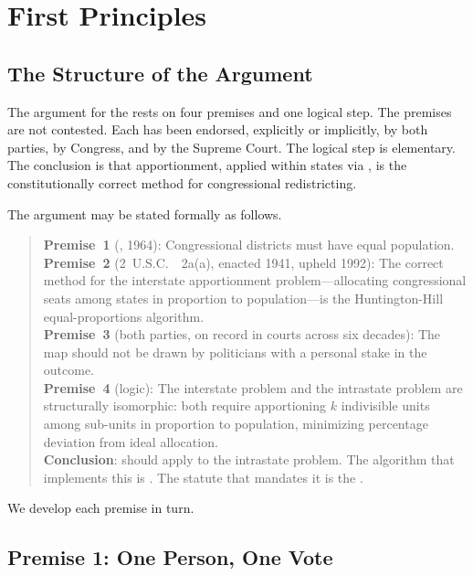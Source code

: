 \section{First Principles}
\label{sec:first-principles}

\subsection{The Structure of the Argument}

The argument for the \dia{} rests on four premises and one logical step.
The premises are not contested.
Each has been endorsed, explicitly or implicitly, by both parties, by
Congress, and by the Supreme Court.
The logical step is elementary.
The conclusion is that \hh{} apportionment, applied within states via \ar{},
is the constitutionally correct method for congressional redistricting.

The argument may be stated formally as follows.

\begin{quotation}
\noindent
\textbf{Premise~1} (\wesberry{}, 1964): Congressional districts must have
equal population.\\[0.5em]
\textbf{Premise~2} (2~U.S.C.~\usca{}~2a(a), enacted 1941, upheld 1992):
The correct method for the interstate apportionment problem---allocating
congressional seats among states in proportion to population---is the
Huntington-Hill equal-proportions algorithm.\\[0.5em]
\textbf{Premise~3} (both parties, on record in courts across six decades):
The map should not be drawn by politicians with a personal stake in the
outcome.\\[0.5em]
\textbf{Premise~4} (logic): The interstate problem and the intrastate
problem are structurally isomorphic: both require apportioning $k$
indivisible units among sub-units in proportion to population,
minimizing percentage deviation from ideal allocation.\\[0.5em]
\textbf{Conclusion}: \hh{} should apply to the intrastate problem.
The algorithm that implements this is \ar{}.
The statute that mandates it is the \dia{}.
\end{quotation}

We develop each premise in turn.

\subsection{Premise 1: One Person, One Vote}

